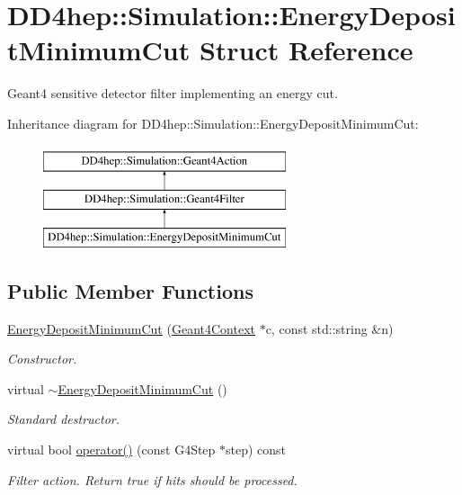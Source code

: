 \hypertarget{struct_d_d4hep_1_1_simulation_1_1_energy_deposit_minimum_cut}{}\section{D\+D4hep\+:\+:Simulation\+:\+:Energy\+Deposit\+Minimum\+Cut Struct Reference}
\label{struct_d_d4hep_1_1_simulation_1_1_energy_deposit_minimum_cut}


Geant4 sensitive detector filter implementing an energy cut.  


Inheritance diagram for D\+D4hep\+:\+:Simulation\+:\+:Energy\+Deposit\+Minimum\+Cut\+:\begin{figure}[H]
\begin{center}
\leavevmode
\includegraphics[height=3.000000cm]{struct_d_d4hep_1_1_simulation_1_1_energy_deposit_minimum_cut}
\end{center}
\end{figure}
\subsection*{Public Member Functions}
\begin{DoxyCompactItemize}
\item 
\hyperlink{struct_d_d4hep_1_1_simulation_1_1_energy_deposit_minimum_cut_a5abe4000163bf6533035fc26ebfb8642}{Energy\+Deposit\+Minimum\+Cut} (\hyperlink{class_d_d4hep_1_1_simulation_1_1_geant4_context}{Geant4\+Context} $\ast$c, const std\+::string \&n)
\begin{DoxyCompactList}\small\item\em Constructor. \end{DoxyCompactList}\item 
virtual \hyperlink{struct_d_d4hep_1_1_simulation_1_1_energy_deposit_minimum_cut_a808a2e16dfa18be72f189409484fe50d}{$\sim$\+Energy\+Deposit\+Minimum\+Cut} ()
\begin{DoxyCompactList}\small\item\em Standard destructor. \end{DoxyCompactList}\item 
virtual bool \hyperlink{struct_d_d4hep_1_1_simulation_1_1_energy_deposit_minimum_cut_ae2c50396bee48f509b0f2d3bc4ceee67}{operator()} (const G4\+Step $\ast$step) const
\begin{DoxyCompactList}\small\item\em Filter action. Return true if hits should be processed. \end{DoxyCompactList}\end{DoxyCompactItemize}
